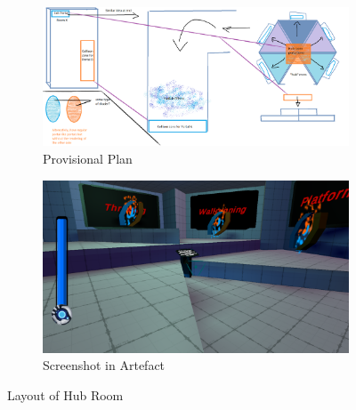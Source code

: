 \begin{figure}[H]
\centering
\begin{subfigure}{0.5\textwidth}
  \centering
  \includegraphics[width=1\linewidth]{Figures/hubplan.png}
  \caption{Provisional Plan}
\end{subfigure}%
\begin{subfigure}{0.5\textwidth}
  \centering
  \includegraphics[width=1\linewidth]{Figures/hub.png}
  \caption{Screenshot in Artefact}
\end{subfigure}
\caption{Layout of Hub Room}
\end{figure}

